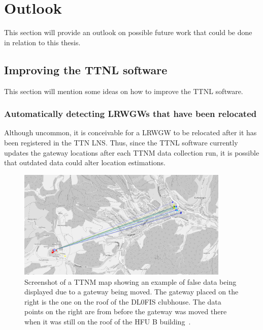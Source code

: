 \section{Outlook}

This section will provide an outlook on possible future work that could be done in relation to this thesis.

\subsection{Improving the \acl{TTNL} software}

This section will mention some ideas on how to improve the \ac{TTNL} software.

\subsubsection{Automatically detecting \aclp{LRWGW} that have been relocated}

Although uncommon, it is conceivable for a \acl{LRWGW} to be relocated after it has been registered in the \ac{TTN} \ac{LNS}.
Thus, since the \ac{TTNL} software currently updates the gateway locations after each \ac{TTNM} data collection run, it is possible that outdated data could alter location estimations.

\begin{figure}[htbp]
    \centering
    \includegraphics[width=0.9\textwidth]{pictures/ttn-mapper/moved_gateway_example.png}
    \caption[Example of false data being displayed on a \acl{TTNM} map due to a gateway being moved]{
        Screenshot of a \ac{TTNM} map showing an example of false data being displayed due to a gateway being moved.
        The gateway placed on the right is the one on the roof of the DL0FIS clubhouse.
        The data points on the right are from before the gateway was moved there when it was still on the roof of the \ac{HFU} B building~\cite{ttn_mapper_ttn_2023}.
    }\label{pic:gateway-moved-example}
\end{figure}

